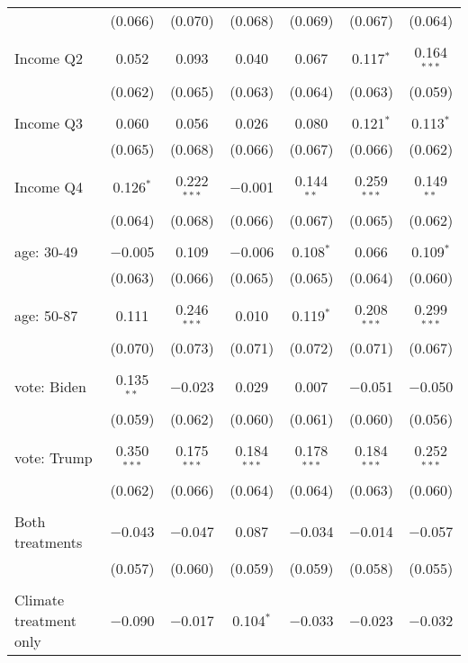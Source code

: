 \begin{tabular}{@{\extracolsep{5pt}}lcccccc}
  & (0.066) & (0.070) & (0.068) & (0.069) & (0.067) & (0.064) \\ 
  & & & & & & \\ 
 Income Q2 & 0.052 & 0.093 & 0.040 & 0.067 & 0.117$^{*}$ & 0.164$^{***}$ \\ 
  & (0.062) & (0.065) & (0.063) & (0.064) & (0.063) & (0.059) \\ 
  & & & & & & \\ 
 Income Q3 & 0.060 & 0.056 & 0.026 & 0.080 & 0.121$^{*}$ & 0.113$^{*}$ \\ 
  & (0.065) & (0.068) & (0.066) & (0.067) & (0.066) & (0.062) \\ 
  & & & & & & \\ 
 Income Q4 & 0.126$^{*}$ & 0.222$^{***}$ & $-$0.001 & 0.144$^{**}$ & 0.259$^{***}$ & 0.149$^{**}$ \\ 
  & (0.064) & (0.068) & (0.066) & (0.067) & (0.065) & (0.062) \\ 
  & & & & & & \\ 
 age: 30-49 & $-$0.005 & 0.109 & $-$0.006 & 0.108$^{*}$ & 0.066 & 0.109$^{*}$ \\ 
  & (0.063) & (0.066) & (0.065) & (0.065) & (0.064) & (0.060) \\ 
  & & & & & & \\ 
 age: 50-87 & 0.111 & 0.246$^{***}$ & 0.010 & 0.119$^{*}$ & 0.208$^{***}$ & 0.299$^{***}$ \\ 
  & (0.070) & (0.073) & (0.071) & (0.072) & (0.071) & (0.067) \\ 
  & & & & & & \\ 
 vote: Biden & 0.135$^{**}$ & $-$0.023 & 0.029 & 0.007 & $-$0.051 & $-$0.050 \\ 
  & (0.059) & (0.062) & (0.060) & (0.061) & (0.060) & (0.056) \\ 
  & & & & & & \\ 
 vote: Trump & 0.350$^{***}$ & 0.175$^{***}$ & 0.184$^{***}$ & 0.178$^{***}$ & 0.184$^{***}$ & 0.252$^{***}$ \\ 
  & (0.062) & (0.066) & (0.064) & (0.064) & (0.063) & (0.060) \\ 
  & & & & & & \\ 
 Both treatments & $-$0.043 & $-$0.047 & 0.087 & $-$0.034 & $-$0.014 & $-$0.057 \\ 
  & (0.057) & (0.060) & (0.059) & (0.059) & (0.058) & (0.055) \\ 
  & & & & & & \\ 
 Climate treatment only & $-$0.090 & $-$0.017 & 0.104$^{*}$ & $-$0.033 & $-$0.023 & $-$0.032 \\ 

\end{tabular}
